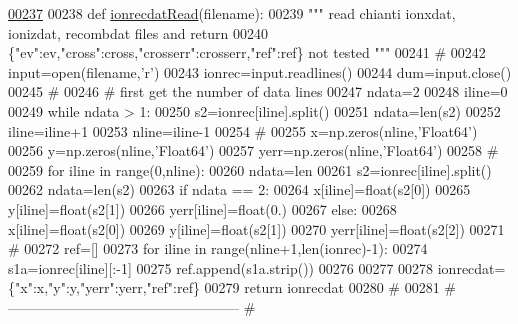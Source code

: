 \begin{DoxyCode}
\hypertarget{namespacepyneb_1_1utils_1_1__chianti__tools_l00237}{}\hyperlink{namespacepyneb_1_1utils_1_1__chianti__tools_a12d45bcebd107c5fd133830132e8cd5e}{00237} 
00238 \textcolor{keyword}{def }\hyperlink{namespacepyneb_1_1utils_1_1__chianti__tools_a12d45bcebd107c5fd133830132e8cd5e}{ionrecdatRead}(filename):
00239     \textcolor{stringliteral}{""" read chianti ionxdat, ionizdat, recombdat files and return}
00240 \textcolor{stringliteral}{    \{"ev":ev,"cross":cross,"crosserr":crosserr,"ref":ref\}  not tested """}
00241     \textcolor{comment}{#}
00242     input=open(filename,\textcolor{stringliteral}{'}\textcolor{stringliteral}{r')}
00243 \textcolor{stringliteral}{    ionrec=input.readlines()}
00244 \textcolor{stringliteral}{    dum=input.close()}
00245 \textcolor{stringliteral}{    }\textcolor{comment}{#}
00246     \textcolor{comment}{# first get the number of data lines}
00247     ndata=2
00248     iline=0
00249     \textcolor{keywordflow}{while} ndata > 1:
00250         s2=ionrec[iline].split()
00251         ndata=len(s2)
00252         iline=iline+1
00253     nline=iline-1
00254     \textcolor{comment}{#}
00255     x=np.zeros(nline,\textcolor{stringliteral}{'Float64'})
00256     y=np.zeros(nline,\textcolor{stringliteral}{'Float64'})
00257     yerr=np.zeros(nline,\textcolor{stringliteral}{'Float64'})
00258 \textcolor{comment}{#}
00259     \textcolor{keywordflow}{for} iline \textcolor{keywordflow}{in} range(0,nline):
00260         ndata=len
00261         s2=ionrec[iline].split()
00262         ndata=len(s2)
00263         \textcolor{keywordflow}{if} ndata == 2:
00264             x[iline]=float(s2[0])
00265             y[iline]=float(s2[1])
00266             yerr[iline]=float(0.)
00267         \textcolor{keywordflow}{else}:
00268             x[iline]=float(s2[0])
00269             y[iline]=float(s2[1])
00270             yerr[iline]=float(s2[2])
00271     \textcolor{comment}{#}
00272     ref=[]
00273     \textcolor{keywordflow}{for} iline \textcolor{keywordflow}{in} range(nline+1,len(ionrec)-1):
00274         s1a=ionrec[iline][:-1]
00275         ref.append(s1a.strip())
00276 
00277 
00278     ionrecdat=\{\textcolor{stringliteral}{"x"}:x,\textcolor{stringliteral}{"y"}:y,\textcolor{stringliteral}{"yerr"}:yerr,\textcolor{stringliteral}{"ref"}:ref\}
00279     \textcolor{keywordflow}{return} ionrecdat
00280     \textcolor{comment}{#}
00281     \textcolor{comment}{# --------------------------------------------------}
    \textcolor{comment}{#}
\end{DoxyCode}
